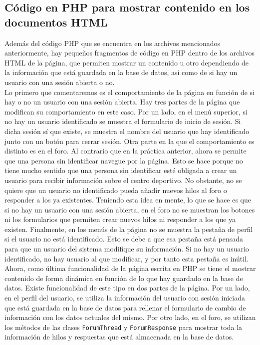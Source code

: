 \documentclass[11pt]{article}
\theoremstyle{plain}
\theoremstyle{definition}
\begin{document}
\subsection{Código en PHP para mostrar contenido en los documentos
  HTML}

Además del código PHP que se encuentra en los archivos mencionados
anteriormente, hay pequeños fragmentos de código en PHP dentro de los
archivos HTML de la página, que permiten mostrar un contenido u otro
dependiendo de la información que está guardada en la base de
datos, así como de si hay un usuario con una sesión abierta o no.\\

Lo primero que comentaremos es el comportamiento de la página en
función de si hay o no un usuario con una sesión abierta. Hay tres
partes de la página que modifican su comportamiento en este caso.  Por
un lado, en el menú superior, si no hay un usuario identificado se
muestra el formulario de inicio de sesión. Si dicha sesión sí que
existe, se muestra el nombre del usuario que hay identificado junto
con un botón para cerrar sesión. Otra parte en la que el
comportamiento es distinto es en el foro. Al contrario que en la
práctica anterior, ahora se permite que una persona sin identificar
navegue por la página. Esto se hace porque no tiene mucho sentido que
una persona sin identificar esté obligada a crear un usuario para
recibir información sobre el centro deportivo. No obstante, no se
quiere que un usuario no identificado pueda añadir nuevos hilos al
foro o responder a los ya existentes. Teniendo esta idea en mente, lo
que se hace es que si no hay un usuario con una sesión abierta, en el
foro no se muestran los botones ni los formularios que permiten crear
nuevos hilos ni responder a los que ya existen. Finalmente, en los
menús de la página no se muestra la pestaña de perfil si el usuario no
está identificado. Esto se debe a que esa pestaña está pensada para
que un usuario del sistema modifique su información. Si no hay un
usuario identificado, no hay usuario al que modificar, y por tanto
esta pestaña es inútil.\\

Ahora, como última funcionalidad de la página escrita en PHP se tiene
el mostrar contenido de forma dinámica en función de lo que hay
guardado en la base de datos. Existe funcionalidad de este tipo en dos
partes de la página. Por un lado, en el perfil del usuario, se utiliza
la información del usuario con sesión iniciada que está guardada en la
base de datos para rellenar el formulario de cambio de información con
los datos actuales del mismo. Por otro lado, en el foro, se utilizan
los métodos de las clases \texttt{ForumThread} y
\texttt{ForumResponse} para mostrar toda la información de hilos y
respuestas que está almacenada en la base de datos.\\
\end{document}
